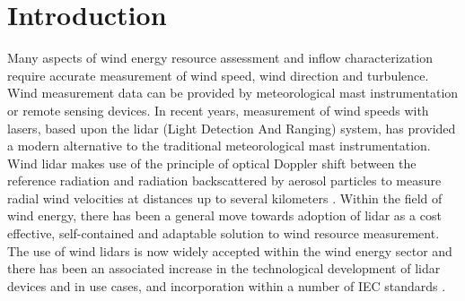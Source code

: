 \documentclass[remotesensing,article,submit,pdftex,moreauthors]{Definitions/mdpi}
\begin{document}



\section{Introduction}
Many aspects of wind energy resource assessment and inflow characterization require accurate measurement of wind speed, wind direction and turbulence. Wind measurement data can be provided by meteorological mast instrumentation or remote sensing devices. In recent years, measurement of wind speeds with lasers, based upon the lidar (Light Detection And Ranging) system, has provided a modern alternative to the traditional meteorological mast instrumentation. Wind lidar makes use of the principle of optical Doppler shift between the reference radiation and radiation backscattered by aerosol particles to measure radial wind velocities at distances up to several kilometers \cite{ref-Liu}.
Within the field of wind energy, there has been a general move towards adoption of lidar as a cost effective, self-contained and adaptable solution to wind resource measurement.
The use of wind lidars is now widely accepted within the wind energy sector and there has been an associated increase in the technological development of lidar devices and in use cases, and incorporation within a number of IEC standards \cite{ref-IEC61400-12-1, ref-IEC61400-50-3}.
\end{document}
